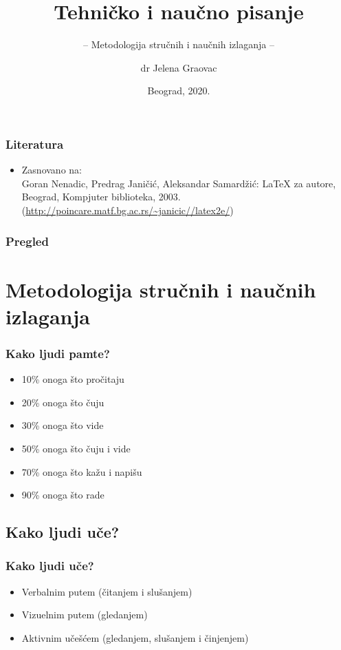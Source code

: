 \documentclass{beamer}
\title{Tehničko i naučno pisanje}
\subtitle{-- Metodologija stručnih i naučnih izlaganja --}
\author{dr Jelena Graovac}
\institute{Matematički fakultet\\Univerzitet u Beogradu}
\date{
	\footnotesize{Beograd, 2020.}	
}
\begin{document}
\begin{frame}
	\thispagestyle{empty}
	\titlepage
\end{frame}

\addtocounter{framenumber}{-1}

\begin{frame}[fragile]\frametitle{Literatura}
	\begin{itemize}
		\item Zasnovano na:\\
		Goran Nenadic, Predrag Janičić, Aleksandar Samardžić: \LaTeX{} za autore, Beograd, Kompjuter biblioteka, 2003.
		(\url{http://poincare.matf.bg.ac.rs/~janicic//latex2e/})
	\end{itemize}
\end{frame}

\begin{frame}
	\frametitle{Pregled} %
	\tableofcontents[hidesubsections] 
\end{frame}

\section{Metodologija stručnih i naučnih izlaganja}

\begin{frame}[fragile]\frametitle{Kako ljudi pamte?}
	\begin{itemize}	
		\item 10\% onoga što pročitaju
		\item 20\% onoga što čuju
		\item 30\% onoga što vide
		\item 50\% onoga što čuju i vide
		\item 70\% onoga što kažu i napišu
		\item 90\% onoga što rade
	\end{itemize}
\end{frame}

\subsection{Kako ljudi uče?}

\begin{frame}[fragile]\frametitle{Kako ljudi uče?}
	\begin{itemize}	
		\item Verbalnim putem (čitanjem i slušanjem)
		\item Vizuelnim putem (gledanjem)
		\item Aktivnim učešćem (gledanjem, slušanjem i činjenjem)
	\end{itemize}
\end{frame}
\end{document}
